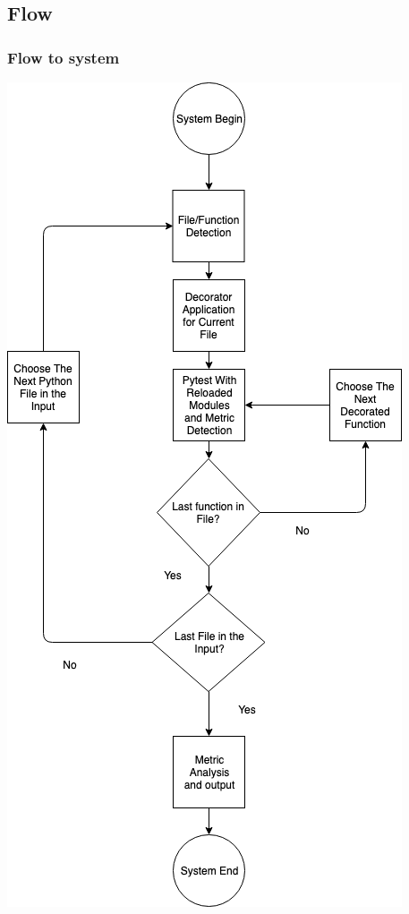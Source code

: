\subsection{Flow}
\begin{frame}
  \frametitle{Flow to system}
    \begin{center}
      \includegraphics[scale = .22]{images/flow.png}
    \end{center}
\end{frame}
